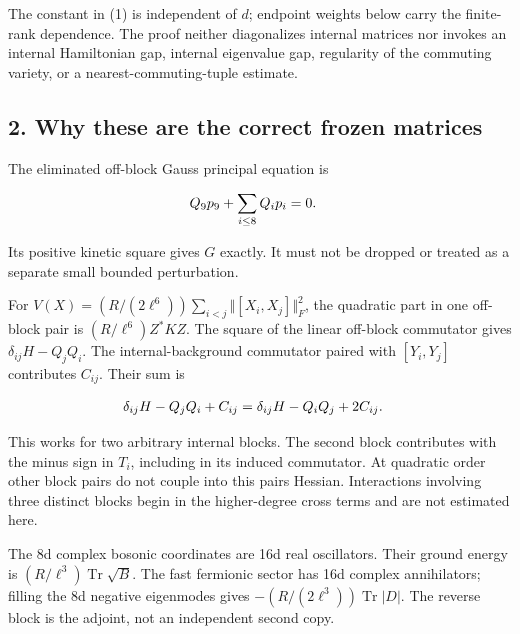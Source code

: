 The constant in (1) is independent of \(d\); endpoint weights below
carry the finite-rank dependence. The proof neither diagonalizes
internal matrices nor invokes an internal Hamiltonian gap, internal
eigenvalue gap, regularity of the commuting variety, or a
nearest-commuting-tuple estimate.

\subsection{2. Why these are the correct frozen
matrices}\label{b-why-these-are-the-correct-frozen-matrices}

The eliminated off-block Gauss principal equation is

\begin{gather*}
\begin{aligned}
& Q_{9} p_{9}+\sum _{i\le 8}Q_{i} p_{i}=0.
\end{aligned}\notag
\end{gather*}

Its positive kinetic square gives \(G\) exactly. It must not be dropped
or treated as a separate small bounded perturbation.

For
\(V(X)=(R/(2\ell ^{6}))\sum _{i<j}\Vert [X_{i},X_{j}]\Vert _{F}^{2}\),
the quadratic part in one off-block pair is \((R/\ell ^{6}) Z^{*} K Z\).
The square of the linear off-block commutator gives
\(\delta _{ij} H-Q_{j} Q_{i}\). The internal-background commutator
paired with \([Y_{i},Y_{j}]\) contributes \(C_{ij}\). Their sum is

\begin{gather*}
\begin{aligned}
& \delta _{ij} H-Q_{j} Q_{i}+C_{ij}= \delta _{ij} H-Q_{i} Q_{j}+2C_{ij}.
\end{aligned}\notag
\end{gather*}

This works for two arbitrary internal blocks. The second block
contributes with the minus sign in \(T_{i}\), including in its induced
commutator. At quadratic order other block pairs do not couple into this
pair\textquotesingle s Hessian. Interactions involving three distinct
blocks begin in the higher-degree cross terms and are not estimated
here.

The 8d complex bosonic coordinates are 16d real oscillators. Their
ground energy is \((R/\ell ^{3})\operatorname{Tr}  \sqrt{B}\). The fast
fermionic sector has 16d complex annihilators; filling the 8d negative
eigenmodes gives \(-(R/(2\ell ^{3}))\operatorname{Tr}  \vert D\vert\).
The reverse block is the adjoint, not an independent second copy.

